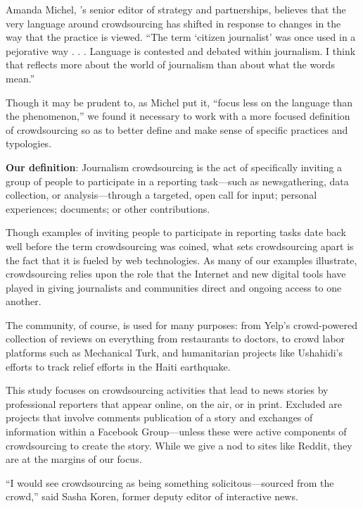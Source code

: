 \begin{itemize}
Amanda Michel, ’s senior editor of strategy and partnerships, believes that the very language around crowdsourcing has shifted in response to changes in the way that the practice is viewed. ``The term ‘citizen journalist’ was once used in a pejorative way . . . Language is contested and debated within journalism. I think that reflects more about the world of journalism than about what the words mean.''\autocite{Michel}

Though it may be prudent to, as Michel put it, ``focus less on the language than the phenomenon,'' we found it necessary to work with a more focused definition of crowdsourcing so as to better define and make sense of specific practices and typologies. 

\textbf{Our definition}: Journalism crowdsourcing is the act of specifically inviting a group of people to participate in a reporting task---such as newsgathering, data collection, or analysis---through a targeted, open call for input; personal experiences; documents; or other contributions.

Though examples of inviting people to participate in reporting tasks date back well before the term crowdsourcing was coined, what sets crowdsourcing apart is the fact that it is fueled by web technologies. As many of our examples illustrate, crowdsourcing relies upon the role that the Internet and new digital tools have played in giving journalists and communities direct and ongoing access to one another.

The community, of course, is used for many purposes: from Yelp’s crowd-powered collection of reviews on everything from restaurants to doctors, to crowd labor platforms such as Mechanical Turk, and humanitarian projects like Ushahidi’s efforts to track relief efforts in the Haiti earthquake. 

This study focuses on crowdsourcing activities that lead to news stories by professional reporters that appear online, on the air, or in print.  Excluded are projects that involve comments  publication of a story and exchanges of information within a Facebook Group---unless these were active components of crowdsourcing to create the story. While we give a nod to sites like Reddit, they are at the margins of our focus.\autocite{text}

 ``I would see crowdsourcing as being something solicitous---sourced from the crowd,'' said Sasha Koren, former  deputy editor of interactive news.\autocite{Koren}
 

\end{itemize}
